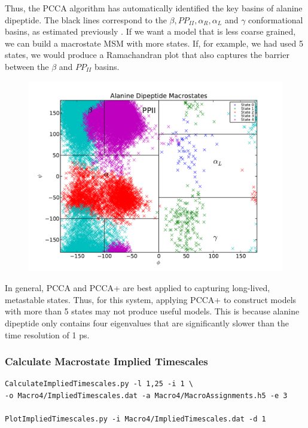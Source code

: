 \documentclass[12pt]{article}
\begin{document}
Thus, the PCCA algorithm has automatically identified the key basins of alanine dipeptide.  The black lines correspond to the $\beta, PP_{II}, \alpha_R, \alpha_L$ and $\gamma$ conformational basins, as estimated previously \cite{Jha2005}.  If we want a model that is less coarse grained, we can build a macrostate MSM with more states.  If, for example, we had used 5 states, we would produce a Ramachandran plot that also captures the barrier between the $\beta$ and $PP_{II}$ basins.  
\begin{figure}
\begin{center}
\includegraphics[width=11.7cm]{figures/Macro5}
\end{center}
\end{figure}

In general, PCCA and PCCA+ are best applied to capturing long-lived, metastable states.  Thus, for this system, applying PCCA+ to construct models with more than 5 states may not produce useful models.  This is because alanine dipeptide only contains four eigenvalues that are significantly slower than the time resolution of 1 ps.  

\subsubsection{Calculate Macrostate Implied Timescales}

\begin{verbatim}
CalculateImpliedTimescales.py -l 1,25 -i 1 \
-o Macro4/ImpliedTimescales.dat -a Macro4/MacroAssignments.h5 -e 3

PlotImpliedTimescales.py -i Macro4/ImpliedTimescales.dat -d 1
\end{verbatim}
\end{document}
